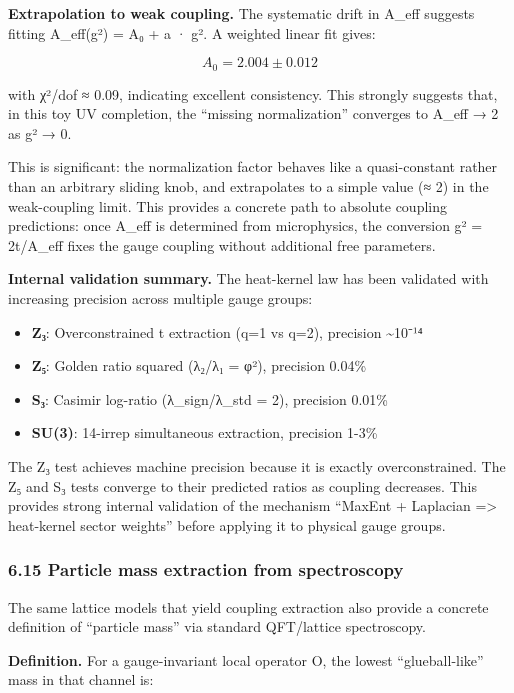\documentclass[
]{article}
\providecommand{\tightlist}{%
  \setlength{\itemsep}{0pt}\setlength{\parskip}{0pt}}
\begin{document}
\textbf{Extrapolation to weak coupling.} The systematic drift in A\_eff
suggests fitting A\_eff(g²) = A₀ + a · g². A weighted linear fit gives:

\[
A_0 = 2.004 \pm 0.012
\]

with χ²/dof ≈ 0.09, indicating excellent consistency. This strongly
suggests that, in this toy UV completion, the ``missing normalization''
converges to A\_eff → 2 as g² → 0.

This is significant: the normalization factor behaves like a
quasi-constant rather than an arbitrary sliding knob, and extrapolates
to a simple value (≈ 2) in the weak-coupling limit. This provides a
concrete path to absolute coupling predictions: once A\_eff is
determined from microphysics, the conversion g² = 2t/A\_eff fixes the
gauge coupling without additional free parameters.

\textbf{Internal validation summary.} The heat-kernel law has been
validated with increasing precision across multiple gauge groups:

\begin{itemize}
\tightlist
\item
  \textbf{Z₃}: Overconstrained t extraction (q=1 vs q=2), precision
  \textasciitilde10⁻¹⁴
\item
  \textbf{Z₅}: Golden ratio squared (λ₂/λ₁ = φ²), precision 0.04\%
\item
  \textbf{S₃}: Casimir log-ratio (λ\_sign/λ\_std = 2), precision 0.01\%
\item
  \textbf{SU(3)}: 14-irrep simultaneous extraction, precision 1-3\%
\end{itemize}

The Z₃ test achieves machine precision because it is exactly
overconstrained. The Z₅ and S₃ tests converge to their predicted ratios
as coupling decreases. This provides strong internal validation of the
mechanism ``MaxEnt + Laplacian =\textgreater{} heat-kernel sector
weights'' before applying it to physical gauge groups.

\subsubsection{6.15 Particle mass extraction from
spectroscopy}\label{particle-mass-extraction-from-spectroscopy}

The same lattice models that yield coupling extraction also provide a
concrete definition of ``particle mass'' via standard QFT/lattice
spectroscopy.

\textbf{Definition.} For a gauge-invariant local operator O, the lowest
``glueball-like'' mass in that channel is:
\end{document}
